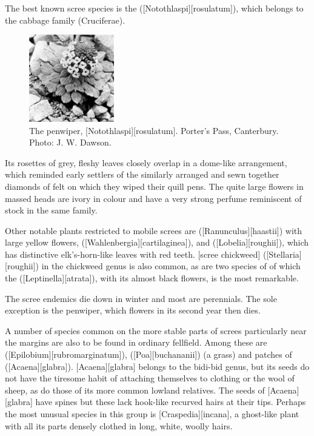 The best known scree species is the  ([Notothlaspi][rosulatum]), which belongs to the cabbage family (Cruciferae).
\begin{figure}
	\includegraphics[width=0.33\textwidth]{graphics/figure112penwiper.jpg}
	\centering
	\caption[The penwiper plant]{The penwiper, [Notothlaspi][rosulatum].
	Porter's Pass, Canterbury.
	Photo: J. W. Dawson.}%
	\label{fig:112penwiper}
\end{figure}
Its rosettes of grey, fleshy leaves closely overlap in a dome-like arrangement, which reminded early settlers of the similarly arranged and sewn together diamonds of felt on which they wiped their quill pens.
The quite large flowers in massed heads are ivory in colour and have a very strong perfume reminiscent of stock in the same family.

Other notable plants restricted to mobile screes are  ([Ranunculus][haastii]) with large yellow flowers,  ([Wahlenbergia][cartilaginea]), and  ([Lobelia][roughii]), which has distinctive elk's-horn-like leaves with red teeth.
[scree chickweed] ([Stellaria][roughii]) in the chickweed genus is also common, as are two species of  of which the  ([Leptinella][atrata]), with its almost black flowers, is the most remarkable.

The scree endemics die down in winter and most are perennials.
The sole exception is the penwiper, which flowers in its second year then dies.

A number of species common on the more stable parts of screes particularly near the margins are also to be found in ordinary fellfield.
Among these are  ([Epilobium][rubromarginatum]),  ([Poa][buchananii]) (a grass) and patches of  ([Acaena][glabra]). [Acaena][glabra] belongs to the bidi-bid genus, but its seeds do not have the tiresome habit of attaching themselves to clothing or the wool of sheep, as do those of its more common lowland relatives.
The seeds of [Acaena][glabra] have spines but these lack hook-like recurved hairs at their tips.
Perhaps the most unusual species in this group is [Craspedia][incana], a ghost-like plant with all its parts densely clothed in long, white, woolly hairs.

